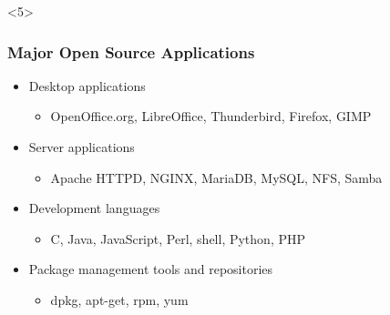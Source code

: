 \documentclass{beamer}
\begin{document}
\begin{frame}
		<5>
	\end{frame}

	\begin{frame}
		\frametitle{Major Open Source Applications}
		\begin{itemize}
			\pause
			\item Desktop applications
			\begin{itemize}
				\pause
				\item OpenOffice.org, LibreOffice, Thunderbird, Firefox, GIMP
			\end{itemize}

			\pause
			\item Server applications
			\begin{itemize}
				\pause
				\item Apache HTTPD, NGINX, MariaDB, MySQL, NFS, Samba
			\end{itemize}

			\pause
			\item Development languages
			\begin{itemize}
				\pause
				\item C, Java, JavaScript, Perl, shell, Python, PHP
			\end{itemize}

			\pause
			\item Package management tools and repositories
			\begin{itemize}
				\pause
				\item dpkg, apt-get, rpm, yum
			\end{itemize}
		\end{itemize}
	\end{frame}
\end{document}
